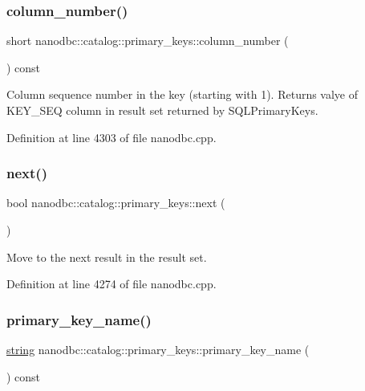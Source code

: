 \subsubsection{\texorpdfstring{column\_number()}{column\_number()}}
{\footnotesize\ttfamily short nanodbc\+::catalog\+::primary\+\_\+keys\+::column\+\_\+number (\begin{DoxyParamCaption}{ }\end{DoxyParamCaption}) const}



Column sequence number in the key (starting with 1). Returns valye of K\+E\+Y\+\_\+\+S\+EQ column in result set returned by S\+Q\+L\+Primary\+Keys. 



Definition at line 4303 of file nanodbc.\+cpp.

\mbox{\label{classnanodbc_1_1catalog_1_1primary__keys_a1bf49eceb97125f61a0bde77a932e0f6}} 
\subsubsection{\texorpdfstring{next()}{next()}}
{\footnotesize\ttfamily bool nanodbc\+::catalog\+::primary\+\_\+keys\+::next (\begin{DoxyParamCaption}{ }\end{DoxyParamCaption})}



Move to the next result in the result set. 



Definition at line 4274 of file nanodbc.\+cpp.

\mbox{\label{classnanodbc_1_1catalog_1_1primary__keys_a97c3ac806273deb1b5ecaea3eb67721f}} 
\subsubsection{\texorpdfstring{primary\_key\_name()}{primary\_key\_name()}}
{\footnotesize\ttfamily \mbox{\hyperlink{namespacenanodbc_abfc0ece56278e590911ec8352774c212}{string}} nanodbc\+::catalog\+::primary\+\_\+keys\+::primary\+\_\+key\+\_\+name (\begin{DoxyParamCaption}{ }\end{DoxyParamCaption}) const}



